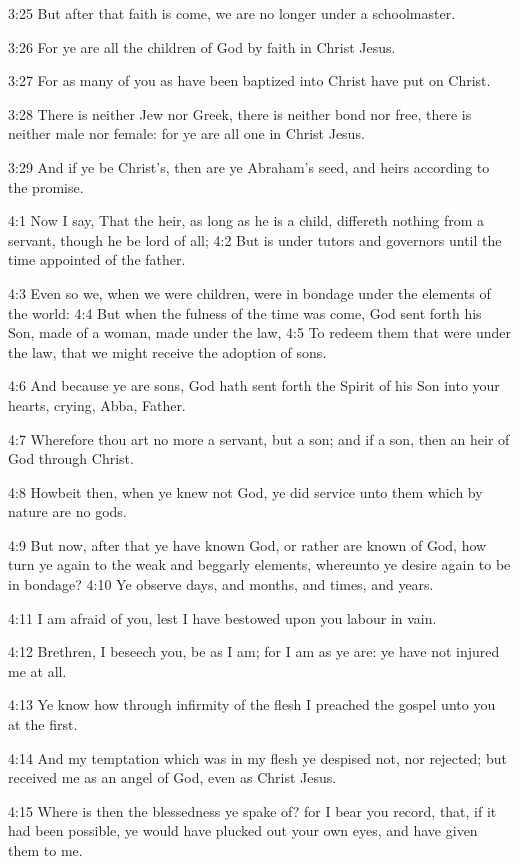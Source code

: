 3:25 But after that faith is come, we are no longer under a schoolmaster.

3:26 For ye are all the children of God by faith in Christ Jesus.

3:27 For as many of you as have been baptized into Christ have put on Christ.

3:28 There is neither Jew nor Greek, there is neither bond nor free, there is neither male nor female: for ye are all one in Christ Jesus.

3:29 And if ye be Christ's, then are ye Abraham's seed, and heirs according to the promise.

4:1 Now I say, That the heir, as long as he is a child, differeth nothing from a servant, though he be lord of all; 4:2 But is under tutors and governors until the time appointed of the father.

4:3 Even so we, when we were children, were in bondage under the elements of the world: 4:4 But when the fulness of the time was come, God sent forth his Son, made of a woman, made under the law, 4:5 To redeem them that were under the law, that we might receive the adoption of sons.

4:6 And because ye are sons, God hath sent forth the Spirit of his Son into your hearts, crying, Abba, Father.

4:7 Wherefore thou art no more a servant, but a son; and if a son, then an heir of God through Christ.

4:8 Howbeit then, when ye knew not God, ye did service unto them which by nature are no gods.

4:9 But now, after that ye have known God, or rather are known of God, how turn ye again to the weak and beggarly elements, whereunto ye desire again to be in bondage?  4:10 Ye observe days, and months, and times, and years.

4:11 I am afraid of you, lest I have bestowed upon you labour in vain.

4:12 Brethren, I beseech you, be as I am; for I am as ye are: ye have not injured me at all.

4:13 Ye know how through infirmity of the flesh I preached the gospel unto you at the first.

4:14 And my temptation which was in my flesh ye despised not, nor rejected; but received me as an angel of God, even as Christ Jesus.

4:15 Where is then the blessedness ye spake of? for I bear you record, that, if it had been possible, ye would have plucked out your own eyes, and have given them to me.


